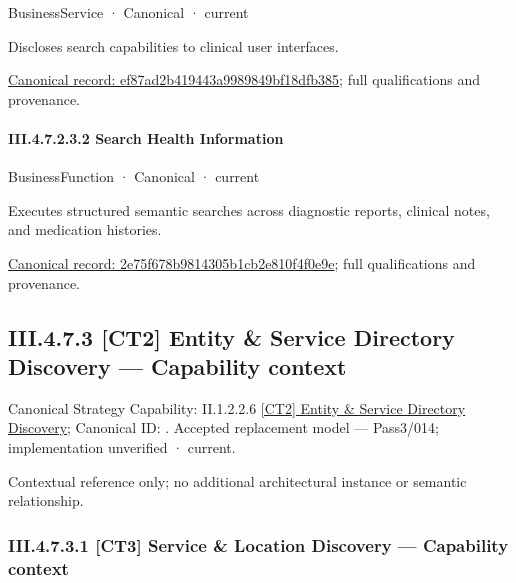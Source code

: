 \label{element:ef87ad2b419443a9989849bf18dfb385}
{\small BusinessService · Canonical · current}\par

Discloses search capabilities to clinical user interfaces.


{\footnotesize \href{../../../../../../../../continuum/business/business-service/ef87ad2b419443a9989849bf18dfb385.md}{Canonical record: ef87ad2b419443a9989849bf18dfb385}; full qualifications and provenance.}\par
\paragraph*{III.4.7.2.3.2 Search Health Information}
\label{navigation:III.4.7.2.3.2}

\label{element:2e75f678b9814305b1cb2e810f4f0e9e}
{\small BusinessFunction · Canonical · current}\par

Executes structured semantic searches across diagnostic reports, clinical notes, and medication histories.


{\footnotesize \href{../../../../../../../../continuum/business/business-function/2e75f678b9814305b1cb2e810f4f0e9e.md}{Canonical record: 2e75f678b9814305b1cb2e810f4f0e9e}; full qualifications and provenance.}\par
\subsection*{III.4.7.3 [CT2] Entity \& Service Directory Discovery — Capability context}
\label{navigation:III.4.7.3}

{\small Canonical Strategy Capability: II.1.2.2.6 \hyperref[element:83e30c3e91be432da6d92f30e5d7005d]{[CT2] Entity \& Service Directory Discovery}; Canonical ID: \texttt{}. Accepted replacement model — Pass3/014; implementation unverified · current.}\par
Contextual reference only; no additional architectural instance or semantic relationship.\par
\subsubsection*{III.4.7.3.1 [CT3] Service \& Location Discovery — Capability context}
\label{navigation:III.4.7.3.1}

